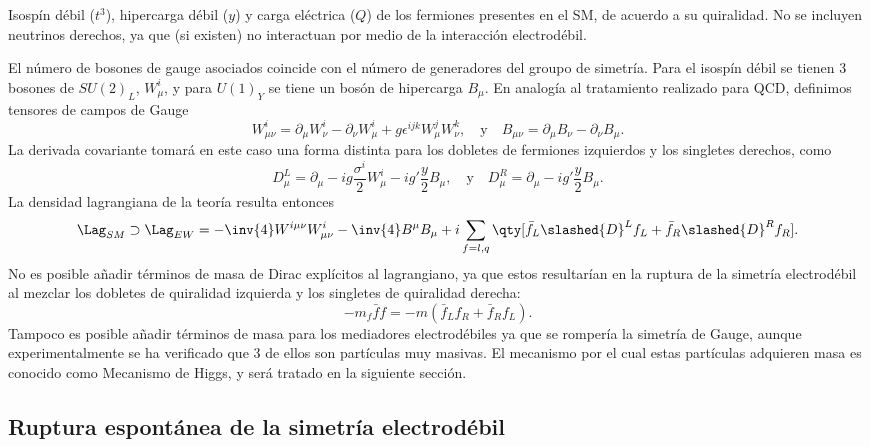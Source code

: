 \begin{margintable}
  \centering
  \setlength{\tabcolsep}{1.5mm}
  \renewcommand{\arraystretch}{1.3}
  
  \caption{Isospín débil ($t^3$), hipercarga débil ($y$) y carga eléctrica ($Q$) de los fermiones presentes en el SM, de acuerdo a su quiralidad. No se incluyen neutrinos derechos, ya que (si existen) no interactuan por medio de la interacción electrodébil.}
  \label{tbl:ch1:SM:EW_isospin-charges}
\end{margintable}

El número de bosones de gauge asociados coincide con el número de generadores del groupo de simetría. Para el isospín débil se tienen 3 bosones de $SU(2)_L$, $W_\mu^i$, y para $U(1)_Y$ se tiene un bosón de hipercarga $B_\mu$. En analogía al tratamiento realizado para QCD, definimos tensores de campos de Gauge
\[
  W^i_{\mu\nu} = \partial_\mu W^i_\nu - \partial_\nu W^i_\mu + g \epsilon^{ijk} W^j_\mu W^k_\nu,
  \quad \text{y} \quad
  B_{\mu\nu} = \partial_\mu B_\nu - \partial_\nu B_\mu.
\]
La derivada covariante tomará en este caso una forma distinta para los dobletes de fermiones izquierdos y los singletes derechos, como
\begin{equation}
  D_\mu^L = \partial_\mu - i g \frac{\sigma^i}{2} W^i_\mu - i g' \frac{y}{2} B_\mu,
  \quad \text{y} \quad
  D_\mu^R = \partial_\mu - i g' \frac{y}{2} B_\mu.
  \label{eq:ch1:SM:EW_covariant_D}
\end{equation}
La densidad lagrangiana de la teoría resulta entonces
\[\Lag_{SM} \supset \Lag_{EW} = -\inv{4} W^{i\mu\nu} W^i_{\mu\nu} - \inv{4} B^\mu B_\mu + i \sum_{f = l, q} \qty[ \bar{f}_L \slashed{D}^L f_L + \bar{f}_R \slashed{D}^R f_R ]. \]
No es posible añadir términos de masa de Dirac explícitos al lagrangiano, ya que estos resultarían en la ruptura de la simetría electrodébil al mezclar los dobletes de quiralidad izquierda y los singletes de quiralidad derecha:
\[ -m_f \bar{f} f = -m(\bar{f}_L f_R + \bar{f}_R f_L). \]
Tampoco es posible añadir términos de masa para los mediadores electrodébiles ya que se rompería la simetría de Gauge, aunque experimentalmente se ha verificado que 3 de ellos son partículas muy masivas. El mecanismo por el cual estas partículas adquieren masa es conocido como Mecanismo de Higgs, y será tratado en la siguiente sección.







\subsection{Ruptura espontánea de la simetría electrodébil}

